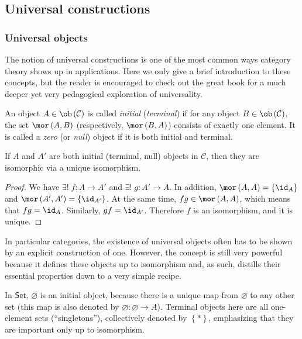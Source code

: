 \subsection{Universal constructions}

\subsubsection{Universal objects}

The notion of universal constructions is one of the most common ways category theory shows up in applications. Here we only give a brief introduction to these concepts, but the reader is encouraged to check out the great book \cite{Bergman} for a much deeper yet very pedagogical exploration of universality.
\begin{defn}
 An object $A\in\ob\left(\mathcal{C}\right)$ is called \emph{initial}
(\emph{terminal}) if for any object $B\in\ob\left(\mathcal{C}\right)$,
the set $\mor\left(A,B\right)$ (respectively, $\mor\left(B,A\right)$)
consists of exactly one element. It is called a \emph{zero} (or
\emph{null}) object if it is both initial and terminal.
\end{defn}
\begin{prop}
If $A$ and $A'$ are both initial (terminal, null) objects in $\mathcal{C}$,
then they are isomorphic via a unique isomorphism.
\end{prop}
\begin{proof}
We have $\exists!\;f:A\to A'$ and $\exists!\;g:A'\to A$. In addition,
$\mor\left(A,A\right)=\left\{ \id_{A}\right\} $ and $\mor\left(A',A'\right)=\left\{ \id_{A'}\right\} $.
At the same time, $fg\in\mor\left(A,A\right)$, which means that $fg=\id_{A}$.
Similarly, $gf=\id_{A'}$. Therefore $f$ is an isomorphism, and it
is unique.
\end{proof}
In particular categories, the existence of universal objects often has to be shown by an explicit construction of one. However, the concept is still very powerful because it defines these objects up to isomorphism and, as such, distills their essential properties down to a very simple recipe.
\begin{example}
In $\mathsf{Set}$, $\varnothing$ is an initial object, because there
is a unique map from $\varnothing$ to any other set (this map is
also denoted by $\varnothing:\varnothing\to A$). Terminal objects
here are all one-element sets (``singletons''), collectively denoted
by $\left\{ \ast\right\} $, emphasizing that they are important only
up to isomorphism.
\end{example}

